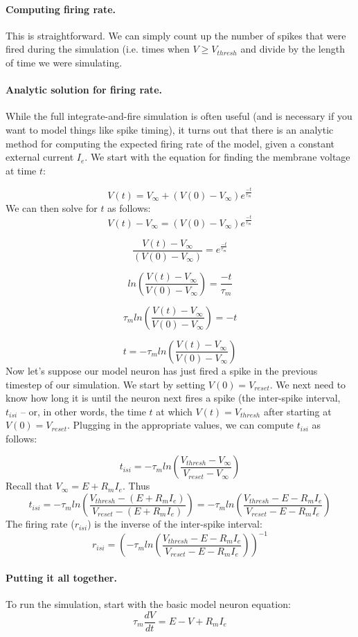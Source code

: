 \documentclass[12pt]{article}
\begin{document}
\paragraph{Computing firing rate.}  This is straightforward.  We can
simply count up the number of spikes that were fired during the
simulation (i.e. times when $V \geq V_{thresh}$ and divide by the
length of time we were simulating.

\paragraph{Analytic solution for firing rate.}  While the full integrate-and-fire
simulation is often useful (and is necessary if you want to model
things like spike timing), it turns out that there is an analytic
method for computing the expected firing rate of the model, given a
constant external current $I_e$.  We start with the equation for
finding the membrane voltage at time $t$:

\[
V(t) = V_\infty + (V(0) - V_\infty) e^\frac{-t}{\tau_m}
\]
We can then solve for $t$ as follows:
\[
V(t) - V_\infty = (V(0) - V_\infty) e^\frac{-t}{\tau_m}
\]

\[
\frac{V(t) - V_\infty}{(V(0) - V_\infty)} = e^\frac{-t}{\tau_m}
\]

\[
ln(\frac{V(t) - V_\infty}{V(0) - V_\infty}) = \frac{-t}{\tau_m}
\]

\[
\tau_mln(\frac{V(t) - V_\infty}{V(0) - V_\infty}) = -t
\]

\[
t = -\tau_mln(\frac{V(t) - V_\infty}{V(0) - V_\infty})
\]
Now let's suppose our model neuron has just fired a spike in the
previous timestep of our simulation.  We start by setting $V(0) =
V_{reset}$.  We next need to know how long it is until the neuron next
fires a spike (the inter-spike interval, $t_{isi}$ -- or, in other
words, the time $t$ at which $V(t) = V_{thresh}$ after starting at
$V(0) = V_{reset}$.  Plugging in the appropriate values, we can
compute $t_{isi}$ as follows:

\[
t_{isi} = -\tau_mln(\frac{V_{thresh} - V_\infty}{V_{reset} - V_\infty})
\]
Recall that $V_\infty = E + R_mI_e$.  Thus
\[
t_{isi} = -\tau_mln(\frac{V_{thresh} - (E + R_mI_e)}{V_{reset} - (E +
  R_mI_e)}) = -\tau_mln(\frac{V_{thresh} - E - R_mI_e}{V_{reset} - E - R_mI_e})
\]
The firing rate ($r_{isi}$) is the inverse of the inter-spike interval:
\[
r_{isi} = (-\tau_mln(\frac{V_{thresh} - E - R_mI_e}{V_{reset} - E - R_mI_e}))^{-1}
\]

\paragraph{Putting it all together.}  To run the simulation, start
with the basic model neuron equation:
\[
\tau_m\frac{dV}{dt} = E - V + R_mI_e
\]
\end{document}
